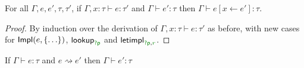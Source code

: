 \begin{lemma}
\label{thm:semantics-impl-pres-subst}
For all $\Gamma, e, e', \tau, \tau'$, if $\Gamma, x:\tau \vdash e : \tau'$ and $\Gamma \vdash e' : \tau$
then $\Gamma \vdash e[x \leftarrow e'] : \tau$.
\end{lemma}
\begin{proof}
  By induction over the derivation of $\Gamma, x:\tau \vdash e : \tau'$ as before, with new
  cases for $\textnormal{\sffamily Impl}(e, \{ \ldots \})$, $\ident{lookup}_{\cclrd{\ident{?p}}}$ and
  $\ident{letimpl}_{\cclrd{\ident{?p}}, \cclrd{r}}$.
\end{proof}

\begin{theorem}
\label{thm:semantics-impl-pres}
  If $\Gamma \vdash e : \tau$ and $e \rightsquigarrow e'$ then $\Gamma \vdash e' : \tau$
\end{theorem}
